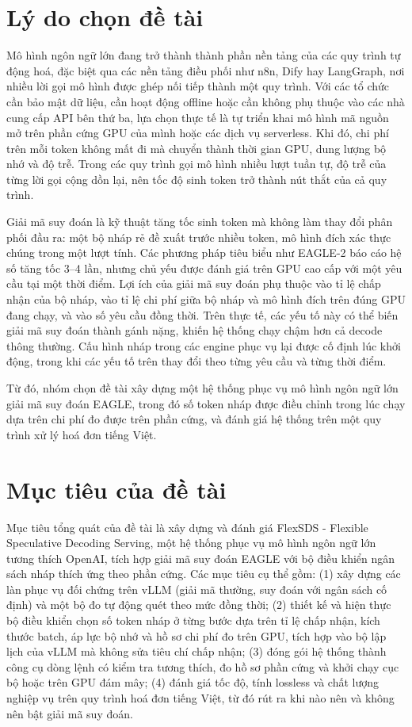 
\section*{Lý do chọn đề tài}

Mô hình ngôn ngữ lớn đang trở thành thành phần nền tảng của các quy trình tự động hoá, đặc biệt qua các nền tảng điều phối như n8n, Dify hay LangGraph, nơi nhiều lời gọi mô hình được ghép nối tiếp thành một quy trình. Với các tổ chức cần bảo mật dữ liệu, cần hoạt động offline hoặc cần không phụ thuộc vào các nhà cung cấp API bên thứ ba, lựa chọn thực tế là tự triển khai mô hình mã nguồn mở trên phần cứng GPU của mình hoặc các dịch vụ serverless. Khi đó, chi phí trên mỗi token không mất đi mà chuyển thành thời gian GPU, dung lượng bộ nhớ và độ trễ. Trong các quy trình gọi mô hình nhiều lượt tuần tự, độ trễ của từng lời gọi cộng dồn lại, nên tốc độ sinh token trở thành nút thắt của cả quy trình.

Giải mã suy đoán là kỹ thuật tăng tốc sinh token mà không làm thay đổi phân phối đầu ra: một bộ nháp rẻ đề xuất trước nhiều token, mô hình đích xác thực chúng trong một lượt tính. Các phương pháp tiêu biểu như EAGLE-2 báo cáo hệ số tăng tốc 3--4 lần, nhưng chủ yếu được đánh giá trên GPU cao cấp với một yêu cầu tại một thời điểm. Lợi ích của giải mã suy đoán phụ thuộc vào tỉ lệ chấp nhận của bộ nháp, vào tỉ lệ chi phí giữa bộ nháp và mô hình đích trên đúng GPU đang chạy, và vào số yêu cầu đồng thời. Trên thực tế, các yếu tố này có thể biến giải mã suy đoán thành gánh nặng, khiến hệ thống chạy chậm hơn cả decode thông thường. Cấu hình nháp trong các engine phục vụ lại được cố định lúc khởi động, trong khi các yếu tố trên thay đổi theo từng yêu cầu và từng thời điểm.

Từ đó, nhóm chọn đề tài xây dựng một hệ thống phục vụ mô hình ngôn ngữ lớn giải mã suy đoán EAGLE, trong đó số token nháp được điều chỉnh trong lúc chạy dựa trên chi phí đo được trên phần cứng, và đánh giá hệ thống trên một quy trình xử lý hoá đơn tiếng Việt.

\section*{Mục tiêu của đề tài}

Mục tiêu tổng quát của đề tài là xây dựng và đánh giá FlexSDS - Flexible Speculative Decoding Serving, một hệ thống phục vụ mô hình ngôn ngữ lớn tương thích OpenAI, tích hợp giải mã suy đoán EAGLE với bộ điều khiển ngân sách nháp thích ứng theo phần cứng. Các mục tiêu cụ thể gồm: (1) xây dựng các làn phục vụ đối chứng trên vLLM (giải mã thường, suy đoán với ngân sách cố định) và một bộ đo tự động quét theo mức đồng thời; (2) thiết kế và hiện thực bộ điều khiển chọn số token nháp ở từng bước dựa trên tỉ lệ chấp nhận, kích thước batch, áp lực bộ nhớ và hồ sơ chi phí đo trên GPU, tích hợp vào bộ lập lịch của vLLM mà không sửa tiêu chí chấp nhận; (3) đóng gói hệ thống thành công cụ dòng lệnh có kiểm tra tương thích, đo hồ sơ phần cứng và khởi chạy cục bộ hoặc trên GPU đám mây; (4) đánh giá tốc độ, tính lossless và chất lượng nghiệp vụ trên quy trình hoá đơn tiếng Việt, từ đó rút ra khi nào nên và không nên bật giải mã suy đoán.

